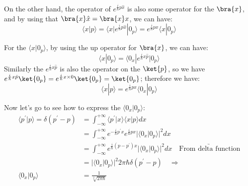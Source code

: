 On the other hand, the operator of $e^{\frac{i}{\hbar}p\hat{x}}$ is
also some operator for the $\bra{x}$, and by using that
$\bra{x}\hat{x} = \bra{x}x$, we can have:
\begin{equation}
  \label{PRAMReq:27}
  \langle x|p \rangle = \langle x|e^{\frac{i}{\hbar}p\hat{x}}|0_{p}
  \rangle  = e^{\frac{i}{\hbar}px}\langle x|0_{p} \rangle
\end{equation}

For the $\langle x|0_{p} \rangle$, by using the up operator for
$\bra{x}$, we can have:
\begin{equation}
  \label{PRAMReq:28}
  \langle x|0_{p} \rangle = \langle 0_{x}|e^{\frac{i}{\hbar}x\hat{p}}|0_{p}
  \rangle
\end{equation}
Similarly the $e^{\frac{i}{\hbar}x\hat{p}}$ is also the operator on
the $\ket{p}$, so we have $e^{\frac{i}{\hbar}x\hat{p}}\ket{0_{p}} =
e^{\frac{i}{\hbar}x\times 0}\ket{0_{p}} = \ket{0_{p}}$; therefore we have:
\begin{equation}
  \label{PRAMReq:29}
  \langle x|p \rangle = e^{\frac{i}{\hbar}px}\langle 0_{x}|0_{p} \rangle
\end{equation}

Now let's go to see how to express the $\langle 0_{x}|0_{p} \rangle$:
\begin{equation}
  \label{PRAMReq:30}
  \begin{split}
    \langle p^{'}|p \rangle = \delta (p^{'} - p) &=
    \int^{+\infty}_{-\infty} \langle p^{'}|x \rangle \langle x|p
    \rangle dx \\
    &= \int^{+\infty}_{-\infty}
    e^{-\frac{i}{\hbar}p^{'}x}e^{\frac{i}{\hbar}px} |\langle
    0_{x}|0_{p}
    \rangle|^{2} dx \\
    &= \int^{+\infty}_{-\infty} e^{\frac{i}{\hbar}(p-p^{'})x}|\langle
    0_{x}|0_{p}
    \rangle|^{2} dx \quad
    \underrightarrow{\text{From delta function}} \\
    &= |\langle 0_{x}|0_{p} \rangle|^{2} 2\pi\hbar\delta(p^{'} - p)
    \quad \Rightarrow \\
    \langle 0_{x}|0_{p} \rangle &= \frac{1}{\sqrt[2]{2\pi\hbar}}
  \end{split}
\end{equation}

